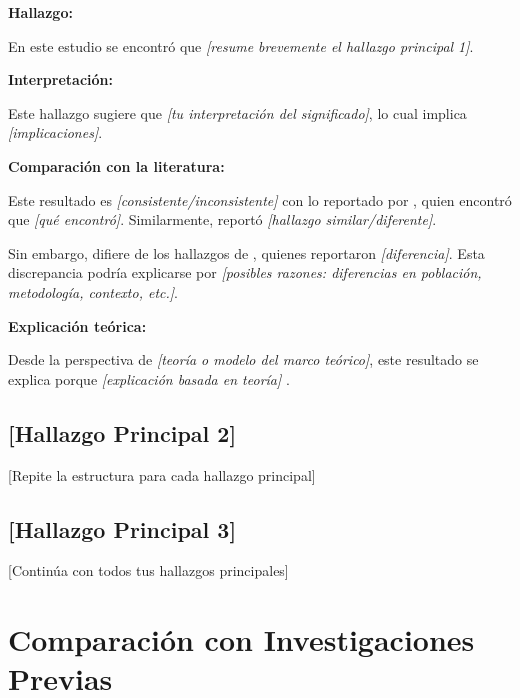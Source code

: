 \textbf{Hallazgo:}

En este estudio se encontró que \textit{{[resume brevemente el hallazgo principal 1]}}.

\textbf{Interpretación:}

Este hallazgo sugiere que \textit{{[tu interpretación del significado]}}, lo cual implica \textit{{[implicaciones]}}.

\textbf{Comparación con la literatura:}

Este resultado es \textit{{[consistente/inconsistente]}} con lo reportado por \cite{autor1}, quien encontró que \textit{{[qué encontró]}}. Similarmente, \cite{autor2} reportó \textit{{[hallazgo similar/diferente]}}.

Sin embargo, difiere de los hallazgos de \cite{autor3}, quienes reportaron \textit{{[diferencia]}}. Esta discrepancia podría explicarse por \textit{{[posibles razones: diferencias en población, metodología, contexto, etc.]}}.

\textbf{Explicación teórica:}

Desde la perspectiva de \textit{{[teoría o modelo del marco teórico]}}, este resultado se explica porque \textit{{[explicación basada en teoría]}} \cite{referencia_teoria}.

\subsection{{[Hallazgo Principal 2]}}
\label{subsec:discusion_hallazgo2}

{[Repite la estructura para cada hallazgo principal]}

\subsection{{[Hallazgo Principal 3]}}
\label{subsec:discusion_hallazgo3}

{[Continúa con todos tus hallazgos principales]}

\section{Comparación con Investigaciones Previas}
\label{sec:comparacion_investigaciones}


